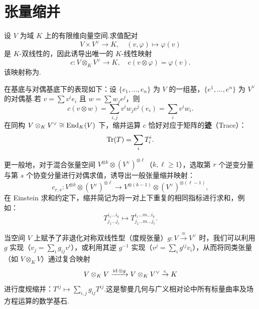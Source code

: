 \section{张量缩并}
\label{sec:contraction}

设 $V$ 为域 $K$ 上的有限维向量空间.求值配对
\[
  V \times V^\vee \to K, \quad (v, \varphi) \mapsto \varphi(v)
\]
是 $K$-双线性的，因此诱导出唯一的 $K$-线性映射
\begin{equation}
  c \colon V \otimes_K V^\vee \to K, \quad c(v \otimes \varphi) = \varphi(v).
\end{equation}
该映射称为.

在基底与对偶基底下的表现如下：设 $\{e_1, \dots, e_n\}$ 为 $V$ 的一组基，$\{e^1, \dots, e^n\}$ 为 $V^\vee$ 的对偶基.若 $v = \sum v^i e_i$ 且 $w = \sum w_j e^j$，则
\begin{equation}
  c(v \otimes w) = \sum_{i, j} v^i w_j e^j(e_i) = \sum_{i} v^i w_i. \label{eq:6.1}
\end{equation}
在同构 $V \otimes_K V^\vee \cong \operatorname{End}_K(V)$ 下，缩并运算 $c$ 恰好对应于矩阵的\textbf{迹}（Trace）：
\[
  \operatorname{Tr}(T) = \sum_{i} T^i_i.
\]

更一般地，对于混合张量空间 $V^{\otimes k} \otimes (V^\vee)^{\otimes \ell}$（$k, \ell \geq 1$），选取第 $r$ 个逆变分量与第 $s$ 个协变分量进行对偶求值，诱导出一般张量缩并映射：
\begin{equation}
  c_{r, s} \colon V^{\otimes k} \otimes (V^\vee)^{\otimes \ell} \to V^{\otimes (k-1)} \otimes (V^\vee)^{\otimes (\ell-1)},
\end{equation}
在 Einstein 求和约定下，缩并简记为将一对上下重复的相同指标进行求和，例如：
\[
  T^{i_1 \dots i_k}_{j_1 \dots j_\ell} \mapsto T^{i_1 \dots m \dots i_k}_{j_1 \dots m \dots j_\ell}.
\]

当空间 $V$ 上赋予了非退化对称双线性型（度规张量）$g \colon V \xrightarrow{\cong} V^\vee$ 时，我们可以利用 $g$ 实现（$v_j = \sum_i g_{ij} v^i$），或利用其逆 $g^{-1}$ 实现（$v^j = \sum_i g^{ij} v_i$），从而将同类张量（如 $V \otimes_K V$）通过复合映射
\begin{equation}
  V \otimes_K V \xrightarrow{\operatorname{id} \otimes g} V \otimes_K V^\vee \xrightarrow{c} K
\end{equation}
进行度规缩并：$T^{ij} \mapsto \sum_{i, j} g_{ij} T^{ij}$.这是黎曼几何与广义相对论中所有标量曲率及场方程运算的数学基石.
